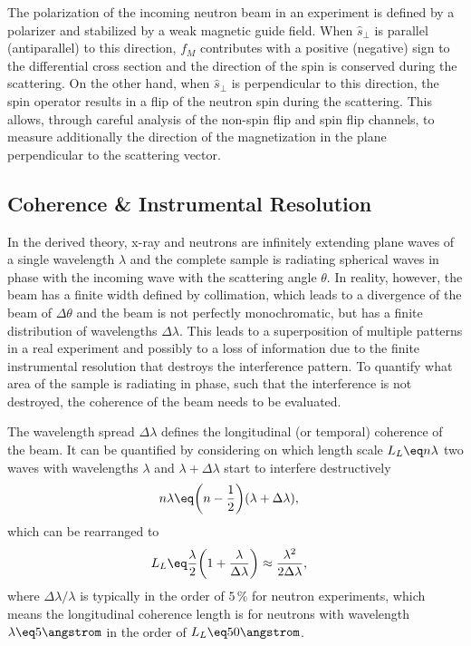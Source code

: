 \documentclass[\main/dresen_thesis.tex]{subfiles}
\begin{document}
The polarization of the incoming neutron beam in an experiment is defined by a polarizer and stabilized by a weak magnetic guide field.
When $\hat{s}_\perp$ is parallel (antiparallel) to this direction, $f_M$ contributes with a positive (negative) sign to the differential cross section and the direction of the spin is conserved during the scattering.
On the other hand, when $\hat{s}_\perp$ is perpendicular to this direction, the spin operator results in a flip of the neutron spin during the scattering.
This allows, through careful analysis of the non-spin flip and spin flip channels, to measure additionally the direction of the magnetization in the plane perpendicular to the scattering vector.



\subsection{Coherence \& Instrumental Resolution}\label{sec:theoreticalBackground:scattering:CoherenceInstrumentalResolution}
In the derived theory, x-ray and neutrons are infinitely extending plane waves of a single wavelength $\lambda$ and the complete sample is radiating spherical waves in phase with the incoming wave with the scattering angle $\theta$.
In reality, however, the beam has a finite width defined by collimation, which leads to a divergence of the beam of $\Delta \theta$ and the beam is not perfectly monochromatic, but has a finite distribution of wavelengths $\Delta \lambda$.
This leads to a superposition of multiple patterns in a real experiment and possibly to a loss of information due to the finite instrumental resolution that destroys the interference pattern.
To quantify what area of the sample is radiating in phase, such that the interference is not destroyed, the coherence of the beam needs to be evaluated.

The wavelength spread $\Delta \lambda$ defines the longitudinal (or temporal) coherence of the beam. It can be quantified by considering on which length scale $L_L \eq n \lambda$ two waves with wavelengths $\lambda$ and $\lambda + \Delta \lambda$ start to interfere destructively
\begin{align}
  n\lambda \eq& \biggl(n - \frac{1}{2} \biggr)(\lambda + \Delta \lambda),
\end{align}
which can be rearranged to
\begin{align}
  L_L \eq& \frac{\lambda}{2} \biggl(1 + \frac{\lambda}{\Delta \lambda} \biggr) \approx \frac{\lambda^2}{2 \Delta \lambda},
\end{align}
where $\Delta \lambda / \lambda$ is typically in the order of $5\, \%$ for neutron experiments, which means the longitudinal coherence length is for neutrons with wavelength $\lambda \eq 5 \angstrom$ in the order of $L_L \eq 50 \angstrom$.
\end{document}
